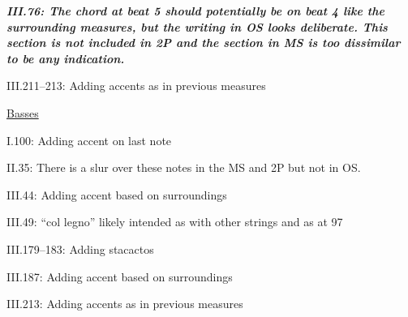 \documentclass[twoside]{article}
\begin{document}
\begin{hangparas}{15pt}{1}
\begin{multicols}{2}
\textbf{\textit{III.76: The chord at beat 5 should potentially be on beat 4 like the surrounding measures, but the writing in OS looks deliberate. This section is not included in 2P and the section in MS is too dissimilar to be any indication.}}

III.211--213: Adding accents as in previous measures

\underline{Basses}

I.100: Adding accent on last note

II.35: There is a slur over these notes in the MS and 2P but not in OS.

III.44: Adding accent based on surroundings

III.49: ``col legno'' likely intended as with other strings and as at 97

III.179--183: Adding stacactos

III.187: Adding accent based on surroundings

III.213: Adding accents as in previous measures

\end{multicols}

\end{hangparas}
\end{document}
